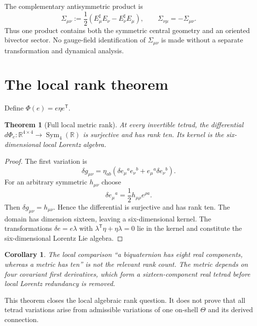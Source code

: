 \documentclass[12pt,a4paper]{article}
\newtheorem{theorem}[definition]{Theorem}
\newtheorem{corollary}[definition]{Corollary}
\theoremstyle{remark}\newtheorem{remark}[definition]{Remark}
\newcommand{\R}{\mathbb R}
\begin{document}
The complementary antisymmetric product is
\begin{equation}
 \Sigma_{\mu\nu}
 :=\frac12(E_\mu^\sharp E_\nu-E_\nu^\sharp E_\mu),
 \qquad \Sigma_{\nu\mu}=-\Sigma_{\mu\nu}.
 \label{eq:sigma}
\end{equation}
Thus one product contains both the symmetric central geometry and an oriented
bivector sector.  No gauge-field identification of $\Sigma_{\mu\nu}$ is made
without a separate transformation and dynamical analysis.

\section{The local rank theorem}
Define $\Phi(e)=e\eta e^{\mathsf T}$.

\begin{theorem}[Full local metric rank]
At every invertible tetrad, the differential
$d\Phi_e:\R^{4\times4}\to\operatorname{Sym}_4(\R)$ is surjective and has rank
ten.  Its kernel is the six-dimensional local Lorentz algebra.
\end{theorem}

\begin{proof}
The first variation is
\[
 \delta g_{\mu\nu}=\eta_{ab}
 (\delta e_\mu{}^a e_\nu{}^b+e_\mu{}^a\delta e_\nu{}^b).
\]
For an arbitrary symmetric $h_{\mu\nu}$ choose
\[
 \delta e_\mu{}^a=\frac12h_{\mu\rho}e^{\rho a}.
\]
Then $\delta g_{\mu\nu}=h_{\mu\nu}$.  Hence the differential is surjective and
has rank ten.  The domain has dimension sixteen, leaving a six-dimensional
kernel.  The transformations $\delta e=e\lambda$ with
$\lambda^{\mathsf T}\eta+\eta\lambda=0$ lie in the kernel and constitute the
six-dimensional Lorentz Lie algebra.
\end{proof}

\begin{corollary}
The local comparison ``a biquaternion has eight real components, whereas a
metric has ten'' is not the relevant rank count.  The metric depends on four
covariant first derivatives, which form a sixteen-component real tetrad before
local Lorentz redundancy is removed.
\end{corollary}

This theorem closes the local algebraic rank question.  It does not prove that
all tetrad variations arise from admissible variations of one on-shell
$\Theta$ and its derived connection.
\end{document}
